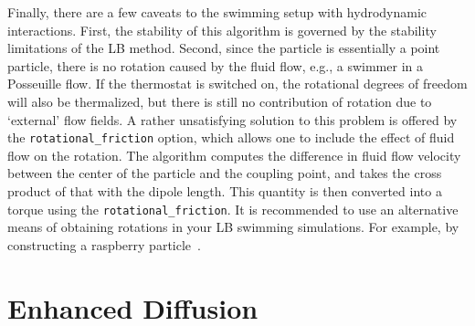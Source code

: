 \documentclass[aip,jcp,reprint,a4paper,onecolumn,amsmath]{revtex4-1}
\newcommand\codees{\lstinline[language=espresso]}
\begin{document}
Finally, there are a few caveats to the swimming setup with hydrodynamic interactions. First, the stability of this algorithm is governed by the stability limitations of the LB method. Second, since the particle is essentially a point particle, there is no rotation caused by the fluid flow, e.g., a swimmer in a Posseuille flow. If the thermostat is switched on, the rotational degrees of freedom will also be thermalized, but there is still no contribution of rotation due to `external' flow fields. A rather unsatisfying solution to this problem is offered by the \codees{rotational_friction} option, which allows one to include the effect of fluid flow on the rotation. The algorithm computes the difference in fluid flow velocity between the center of the particle and the coupling point, and takes the cross product of that with the dipole length. This quantity is then converted into a torque using the \codees{rotational_friction}. It is recommended to use an alternative means of obtaining rotations in your LB swimming simulations. For example, by constructing a raspberry particle~\cite{lobaskin04,chatterji05,fischer15,degraaf15}. 

\section{\label{sec:enhanced}Enhanced Diffusion}
\end{document}
